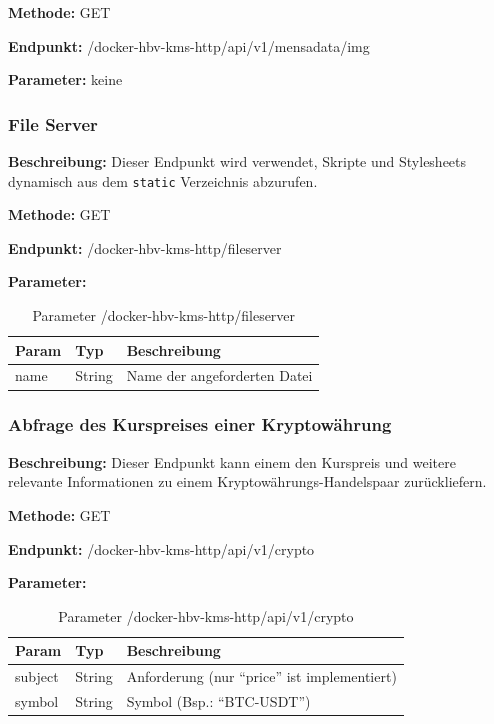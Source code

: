 \textbf{Methode:} GET

\textbf{Endpunkt:} /docker-hbv-kms-http/api/v1/mensadata/img

\textbf{Parameter:} keine

\dotfill

\subsubsection{File Server}
\label{sec:api-fileserver}
\textbf{Beschreibung:} Dieser Endpunkt wird verwendet, Skripte und Stylesheets dynamisch aus dem \verb|static| Verzeichnis
abzurufen.

\textbf{Methode:} GET

\textbf{Endpunkt:} /docker-hbv-kms-http/fileserver

\textbf{Parameter:}
\begin{table}[H]
    \label{table:/docker-hbv-kms-http/fileserver}
    \caption{Parameter /docker-hbv-kms-http/fileserver}
    \setlength{\tabcolsep}{3pt}
    \begin{tabular}{p{100pt}p{80pt}p{200pt}}
        \toprule
        Param & Typ    & Beschreibung                 \\
        \midrule
        name  & String & Name der angeforderten Datei \\
        \bottomrule
    \end{tabular}
\end{table}
\dotfill


\subsubsection{Abfrage des Kurspreises einer Kryptowährung}
\label{sec:api-crypto}
\textbf{Beschreibung:} Dieser Endpunkt kann einem den Kurspreis und weitere relevante Informationen zu einem Kryptowährungs-Handelspaar zurückliefern.

\textbf{Methode:} GET

\textbf{Endpunkt:} /docker-hbv-kms-http/api/v1/crypto

\textbf{Parameter:}
\begin{table}[H]
    \label{table:/docker-hbv-kms-http/api/v1/crypto}
    \caption{Parameter /docker-hbv-kms-http/api/v1/crypto}
    \setlength{\tabcolsep}{3pt}
    \begin{tabular}{p{100pt}p{80pt}p{200pt}}
        \toprule
        Param   & Typ    & Beschreibung                                  \\
        \midrule
        subject & String & Anforderung (nur ``price'' ist implementiert) \\
        symbol  & String & Symbol (Bsp.: ``BTC-USDT'')                   \\
        \bottomrule
    \end{tabular}
\end{table}
\dotfill

